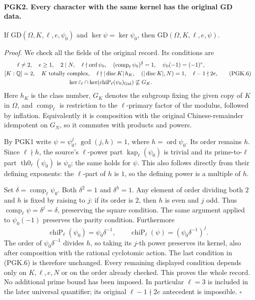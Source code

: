 \paragraph{PGK2. Every character with the same kernel has the original GD data.}
\label{claim:PGK2}
If \(\mathrm{GD}(\Omega,K,\ell,e,\psi_0)\) and
\(\ker\psi=\ker\psi_0\), then
\(\mathrm{GD}(\Omega,K,\ell,e,\psi)\).

\emph{Proof.}
We check all the fields of the original record. Its conditions are
\[
 \begin{gathered}
 \ell\ne2,\quad e\ge1,\quad 2\mid N,\quad
 \ell\nmid\operatorname{ord}\psi_0,\quad
       (\operatorname{comp}_\ell\psi_0)^2=1,\quad
       \psi_0(-1)=(-1)^e,\\
 [K:\mathbb Q]=2,\quad K\text{ totally complex},\quad
 \ell\nmid|\operatorname{disc}K|\,h_K,\quad
       (|\operatorname{disc}K|,N)=1,\quad \ell-1\nmid2e,\\
 \ker\bar\varepsilon_\ell\cap
     \ker(\operatorname{chiP}_\ell(\psi_0)_{\rm Gal})
                                      \not\subseteq G_K .
 \end{gathered}                                                  \tag{PGK.6}
\]
Here \(h_K\) is the class number, \(G_K\) denotes the subgroup
fixing the given copy of \(K\) in \(\Omega\), and
\(\operatorname{comp}_\ell\) is restriction to the
\(\ell\)-primary factor of the modulus, followed by inflation.
Equivalently it is composition with the original Chinese-remainder
idempotent on \(G_N\), so it commutes with products and powers.

By PGK1 write \(\psi=\psi_0^j\), \(\gcd(j,h)=1\), where
\(h=\operatorname{ord}\psi_0\). Its order remains \(h\).
Since \(\ell\nmid h\), the source's \(\ell\)-power part
\(\operatorname{kap}_\ell(\psi_0)\) is trivial and its
prime-to-\(\ell\) part \(\operatorname{th0}_\ell(\psi_0)\)
is \(\psi_0\); the same holds for \(\psi\). This also follows
directly from their defining exponents: the \(\ell\)-part of
\(h\) is \(1\), so the defining power is a multiple of \(h\).

Set \(\delta=\operatorname{comp}_\ell\psi_0\). Both
\(\delta^2=1\) and \(\delta^h=1\). Any element of order dividing
both \(2\) and \(h\) is fixed by raising to \(j\): if its order
is \(2\), then \(h\) is even and \(j\) odd. Thus
\(\operatorname{comp}_\ell\psi=\delta^j=\delta\), preserving
the square condition. The same argument applied to
\(\psi_0(-1)\) preserves the parity condition.
Furthermore
\[
 \operatorname{chiP}_\ell(\psi_0)=\psi_0\delta^{-1},\qquad
 \operatorname{chiP}_\ell(\psi)
                 =(\psi_0\delta^{-1})^j .                      \tag{PGK.7}
\]
The order of \(\psi_0\delta^{-1}\) divides \(h\), so taking
its \(j\)-th power preserves its kernel, also after composition
with the rational cyclotomic action. The last condition in
(PGK.6) is therefore unchanged. Every remaining displayed
condition depends only on \(K,\ell,e,N\) or on the order
already checked. This proves the whole record.
No additional prime bound has been imposed. In particular
\(\ell=3\) is included in the later universal quantifier;
its original \(\ell-1\nmid2e\) antecedent is impossible.
\hfill\(\square\)

